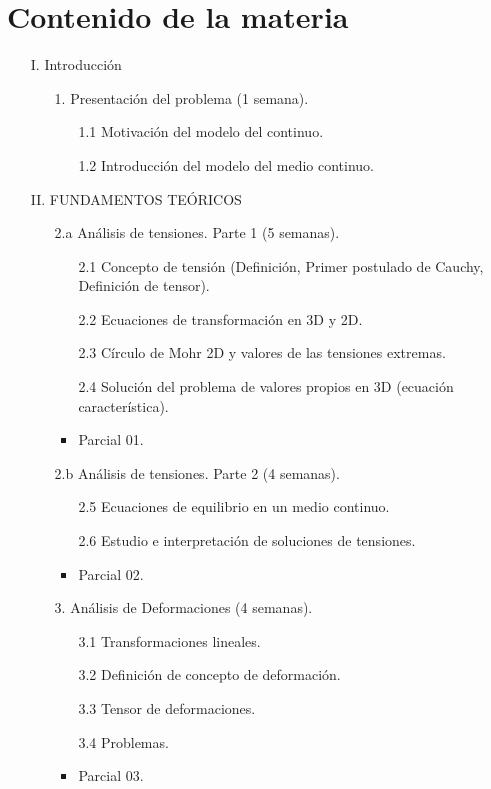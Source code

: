 \section*{Contenido de la materia}
\begin{itemize}
	\item[I.] Introducción
	\begin{itemize}
		\item[1.] Presentación del problema (1 semana).
		\begin{itemize}
			\item[1.1] Motivación del modelo del continuo.
			\item[1.2] Introducción del modelo del medio continuo.	
		\end{itemize}
	\end{itemize}

	\item[II.] FUNDAMENTOS TEÓRICOS
	\begin{itemize}
		\item[2.a] Análisis de tensiones. Parte 1 (5 semanas).
		\begin{itemize}
			\item[2.1] Concepto de tensión (Definición, Primer postulado de Cauchy, Definición de tensor).			
			\item[2.2] Ecuaciones de transformación en 3D y 2D.
			\item[2.3] Círculo de Mohr 2D y valores de las tensiones extremas.
			\item[2.4] Solución del problema de valores propios en 3D (ecuación característica).
			\item Parcial 01.
		\end{itemize}			

		\item[2.b] Análisis de tensiones. Parte 2 (4 semanas).
		\begin{itemize}						
			\item[2.5] Ecuaciones de equilibrio en un medio continuo.
			\item[2.6] Estudio e interpretación de soluciones de tensiones.
			\item Parcial 02.
		\end{itemize}
		
		\item[3.] Análisis de Deformaciones (4 semanas).
		\begin{itemize}
			\item[3.1] Transformaciones lineales.
			\item[3.2] Definición de concepto de deformación.
			\item[3.3] Tensor de deformaciones.
			\item[3.4] Problemas.
			\item Parcial 03.
		\end{itemize}
		

\end{itemize}
\end{itemize}
